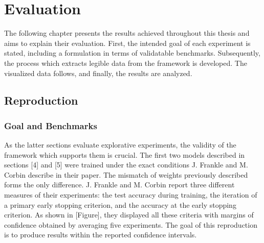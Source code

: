 \chapter{Evaluation}
\label{ch:evaluation}
The following chapter presents the results achieved throughout this thesis and aims to explain their evaluation. First, the intended goal of each experiment is stated, including a  formulation in terms of validatable benchmarks. Subsequently, the process which extracts legible data from the framework is developed. The visualized data follows, and finally, the results are analyzed.

\section{Reproduction}
\subsection*{Goal and Benchmarks}
As the latter sections evaluate explorative experiments, the validity of the framework which supports them is crucial. The first two models described in sections [4] and [5] were trained under the exact conditions J. Frankle and M. Corbin describe in their paper. The mismatch of weights previously described forms the only difference.
J. Frankle and M. Corbin report three different measures of their experiments: the test accuracy during training, the iteration of a primary early stopping criterion, and the accuracy at the early stopping criterion. As shown in [Figure], they displayed all these criteria with margins of confidence obtained by averaging five experiments. The goal of this reproduction is to produce results within the reported confidence intervals.  
